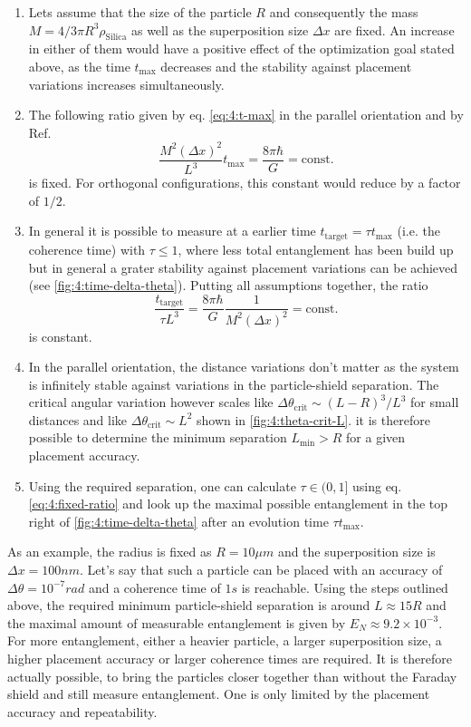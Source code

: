 \begin{enumerate}
  \item Lets assume that the size of the particle $R$ and consequently the mass $M=4/3 \pi R^3 \rho_\mathrm{Silica}$ as well as the superposition size $\Delta x$ are fixed. An increase in either of them would have a positive effect of the optimization goal stated above, as the time $t_\mathrm{max}$ decreases and the stability against placement variations increases simultaneously.
  \item The following ratio given by eq. \eqref{eq:4:t-max} in the parallel orientation and by Ref. \cite{Aspelmeyer_2024}
  \begin{equation}
    \frac{M^2 (\Delta x)^2}{L^3}t_\mathrm{max} = \frac{8 \pi \hbar}{G} = \mathrm{const.} 
  \end{equation} 
  is fixed. For orthogonal configurations, this constant would reduce by a factor of $1/2$. 
  \item In general it is possible to measure at a earlier time $t_\mathrm{target} = \tau t_\mathrm{max}$ (i.e. the coherence time) with $\tau \leq 1$, where less total entanglement has been build up but in general a grater stability against placement variations can be achieved (see \cref{fig:4:time-delta-theta}). Putting all assumptions together, the ratio
  \begin{equation}\label{eq:4:fixed-ratio}
    \frac{t_\mathrm{target}}{\tau L^3} = \frac{8\pi \hbar}{G} \frac{1}{M^2 (\Delta x)^2} = \mathrm{const.}
  \end{equation}
  is constant.
  \item In the parallel orientation, the distance variations don't matter as the system is infinitely stable against variations in the particle-shield separation. The critical angular variation however scales like $\Delta \theta_\mathrm{crit} \sim (L-R)^3/L^3$ for small distances and like $\Delta \theta_\mathrm{crit} \sim L^2$ shown in \cref{fig:4:theta-crit-L}. it is therefore possible to determine the minimum separation $L_\mathrm{min} > R$ for a given placement accuracy.
  \item Using the required separation, one can calculate $\tau \in (0, 1]$ using eq. \eqref{eq:4:fixed-ratio} and look up the maximal possible entanglement in the top right of \cref{fig:4:time-delta-theta} after an evolution time $\tau t_\mathrm{max}$.
\end{enumerate}
As an example, the radius is fixed as $R=10\si{\mu m}$ and the superposition size is $\Delta x = 100\si{nm}$. Let's say that such a particle can be placed with an accuracy of $\Delta \theta = 10^{-7} \si{rad}$ and a coherence time of $1\si{s}$ is reachable. 
Using the steps outlined above, the required minimum particle-shield separation is around $L\approx 15R$ and the maximal amount of measurable entanglement is given by $E_N \approx 9.2\times 10^{-3}$.
For more entanglement, either a heavier particle, a larger superposition size, a higher placement accuracy or larger coherence times are required. 
It is therefore actually possible, to bring the particles closer together than without the Faraday shield and still measure entanglement. One is only limited by the placement accuracy and repeatability.